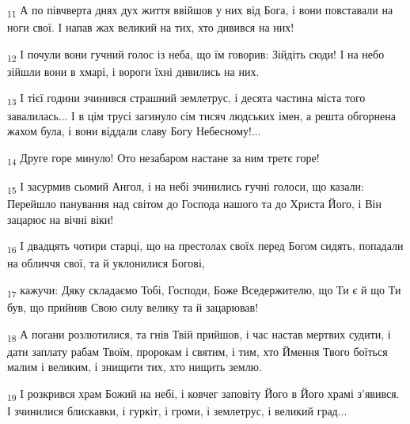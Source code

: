 \begin{tcolorbox}
\textsubscript{11} А по півчверта днях дух життя ввійшов у них від Бога, і вони повставали на ноги свої. І напав жах великий на тих, хто дивився на них!
\end{tcolorbox}
\begin{tcolorbox}
\textsubscript{12} І почули вони гучний голос із неба, що їм говорив: Зійдіть сюди! І на небо зійшли вони в хмарі, і вороги їхні дивились на них.
\end{tcolorbox}
\begin{tcolorbox}
\textsubscript{13} І тієї години зчинився страшний землетрус, і десята частина міста того завалилась... І в цім трусі загинуло сім тисяч людських імен, а решта обгорнена жахом була, і вони віддали славу Богу Небесному!...
\end{tcolorbox}
\begin{tcolorbox}
\textsubscript{14} Друге горе минуло! Ото незабаром настане за ним третє горе!
\end{tcolorbox}
\begin{tcolorbox}
\textsubscript{15} І засурмив сьомий Ангол, і на небі зчинились гучні голоси, що казали: Перейшло панування над світом до Господа нашого та до Христа Його, і Він зацарює на вічні віки!
\end{tcolorbox}
\begin{tcolorbox}
\textsubscript{16} І двадцять чотири старці, що на престолах своїх перед Богом сидять, попадали на обличчя свої, та й уклонилися Богові,
\end{tcolorbox}
\begin{tcolorbox}
\textsubscript{17} кажучи: Дяку складаємо Тобі, Господи, Боже Вседержителю, що Ти є й що Ти був, що прийняв Свою силу велику та й зацарював!
\end{tcolorbox}
\begin{tcolorbox}
\textsubscript{18} А погани розлютилися, та гнів Твій прийшов, і час настав мертвих судити, і дати заплату рабам Твоїм, пророкам і святим, і тим, хто Ймення Твого боїться малим і великим, і знищити тих, хто нищить землю.
\end{tcolorbox}
\begin{tcolorbox}
\textsubscript{19} І розкрився храм Божий на небі, і ковчег заповіту Його в Його храмі з'явився. І зчинилися блискавки, і гуркіт, і громи, і землетрус, і великий град...
\end{tcolorbox}
